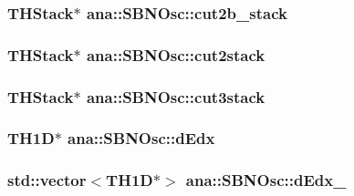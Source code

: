 \label{namespaceana_1_1SBNOsc_a13e04f5a0bc2bf349e9947a45bc609bb}
\hypertarget{namespaceana_1_1SBNOsc_abee8fcfad8f7a669abab543ecb154c40}{
\subsubsection[{cut2b\_\-stack}]{\setlength{\rightskip}{0pt plus 5cm}THStack$\ast$ {\bf ana::SBNOsc::cut2b\_\-stack}}}
\label{namespaceana_1_1SBNOsc_abee8fcfad8f7a669abab543ecb154c40}
\hypertarget{namespaceana_1_1SBNOsc_a4759d52cc74712f52a292470ae186ac9}{
\subsubsection[{cut2stack}]{\setlength{\rightskip}{0pt plus 5cm}THStack$\ast$ {\bf ana::SBNOsc::cut2stack}}}
\label{namespaceana_1_1SBNOsc_a4759d52cc74712f52a292470ae186ac9}
\hypertarget{namespaceana_1_1SBNOsc_a59ec32e8647b070c9eedcc543a4ff12b}{
\subsubsection[{cut3stack}]{\setlength{\rightskip}{0pt plus 5cm}THStack$\ast$ {\bf ana::SBNOsc::cut3stack}}}
\label{namespaceana_1_1SBNOsc_a59ec32e8647b070c9eedcc543a4ff12b}
\hypertarget{namespaceana_1_1SBNOsc_a8b644de838352477b63ffdd383f6c253}{
\subsubsection[{dEdx}]{\setlength{\rightskip}{0pt plus 5cm}TH1D$\ast$ {\bf ana::SBNOsc::dEdx}}}
\label{namespaceana_1_1SBNOsc_a8b644de838352477b63ffdd383f6c253}
\hypertarget{namespaceana_1_1SBNOsc_ab49147463b012e19132ce3747551ddfd}{
\subsubsection[{dEdx\_\-2}]{\setlength{\rightskip}{0pt plus 5cm}std::vector$<$TH1D$\ast$$>$ {\bf ana::SBNOsc::dEdx\_}}}
